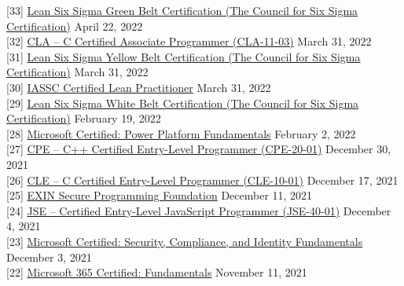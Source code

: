 \documentclass[10pt]{res} %
\begin{document}
\begin{resume}
{[33]} \phantom{0}\href{https://badgr.com/public/assertions/62670c5d427a6e2155ba957a}{\color{blue}Lean Six Sigma Green Belt Certification (The Council for Six Sigma Certification)} \hfill April 22, 2022 \\
{[32]} \phantom{0}\href{https://www.credly.com/badges/9959f27c-1482-4bb8-9938-9bd81493e8f7}{\color{blue}CLA -- C Certified Associate Programmer (CLA-11-03)} \hfill March 31, 2022 \\
{[31]} \phantom{0}\href{https://badgr.com/public/assertions/pwTFqXPZSXGhUu0J8yfrRA}{\color{blue}Lean Six Sigma Yellow Belt Certification (The Council for Six Sigma Certification)} \hfill March 31, 2022 \\
{[30]} \phantom{0}\href{https://badges.peoplecert.org/Badge/en/2/AA41F7D8-4514-40A7-B3CB-DA0821E9FDC6?1384}{\color{blue}IASSC\textsuperscript{\textregistered} Certified Lean Practitioner\texttrademark} \hfill March 31, 2022 \\
{[29]} \phantom{0}\href{https://badgr.com/public/assertions/6212669d80efe67cb95aeb39}{\color{blue}Lean Six Sigma White Belt Certification (The Council for Six Sigma Certification)} \hfill February 19, 2022 \\
{[28]} \phantom{0}\href{https://www.credly.com/badges/21870603-fbfa-4623-a2eb-b618bcc4dff1}{\color{blue}Microsoft Certified: Power Platform Fundamentals} \hfill February 2, 2022 \\
{[27]} \phantom{0}\href{https://www.credly.com/badges/3d7afbab-8088-4b70-bf20-529007fe2899}{\color{blue}CPE -- C++ Certified Entry-Level Programmer (CPE-20-01)} \hfill December 30, 2021 \\
{[26]} \phantom{0}\href{https://www.credly.com/badges/aff73cf2-e015-41bb-8afc-bf33c4defac8}{\color{blue}CLE -- C Certified Entry-Level Programmer (CLE-10-01)} \hfill December 17, 2021 \\
{[25]} \phantom{0}\href{https://app.exeed.pro/holder/badge/102733}{\color{blue}EXIN Secure Programming Foundation} \hfill December 11, 2021 \\
{[24]} \phantom{0}\href{https://www.credly.com/badges/14ccba5e-391e-4d8b-a75c-61783c6f1ffa}{\color{blue}JSE -- Certified Entry-Level JavaScript Programmer (JSE-40-01)} \hfill December 4, 2021 \\
{[23]} \phantom{0}\href{https://www.credly.com/badges/1833c12e-bba5-42ab-9441-f157a7259eaa}{\color{blue}Microsoft Certified: Security, Compliance, and Identity Fundamentals} \hfill December 3, 2021 \\
{[22]} \phantom{0}\href{https://www.credly.com/badges/832558f6-c7cc-4f71-b4b4-45d398005db3}{\color{blue}Microsoft 365 Certified: Fundamentals} \hfill November 11, 2021 \\

\end{resume}
\end{document}
